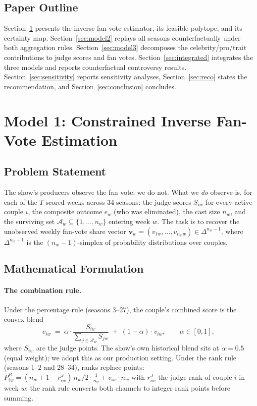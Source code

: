 \documentclass[11pt]{article}
\begin{document}
\subsection{Paper Outline}

Section~\ref{sec:model1} presents the inverse fan-vote estimator, its feasible polytope, and its
certainty map. Section~\ref{sec:model2} replays all seasons counterfactually under both
aggregation rules. Section~\ref{sec:model3} decomposes the celebrity/pro/trait contributions to
judge scores and fan votes. Section~\ref{sec:integrated} integrates the three models and reports
counterfactual controversy results. Section~\ref{sec:sensitivity} reports sensitivity analyses,
Section~\ref{sec:reco} states the recommendation, and Section~\ref{sec:conclusion} concludes.

\clearpage
\section{Model 1: Constrained Inverse Fan-Vote Estimation}
\label{sec:model1}

\subsection{Problem Statement}

The show's producers observe the fan vote; we do not. What we \emph{do} observe is, for each of
the $T$ scored weeks across 34 seasons: the judge scores $S_{iw}$ for every active couple $i$, the
composite outcome $e_w$ (who was eliminated), the cast size $n_w$, and the surviving set
$\mathcal{A}_w \subseteq \{1,\dots,n_w\}$ entering week $w$. The task is to recover the
unobserved weekly fan-vote share vector
$\mathbf{v}_w = (v_{1w}, \dots, v_{n_w w}) \in \Delta^{n_w - 1}$,
where $\Delta^{n_w - 1}$ is the $(n_w-1)$-simplex of probability distributions over couples.

\subsection{Mathematical Formulation}

\paragraph{The combination rule.} Under the percentage rule (seasons 3--27), the couple's
combined score is the convex blend
\begin{equation}
c_{iw} \;=\; \alpha \cdot \frac{S_{iw}}{\sum_{j \in \mathcal{A}_w} S_{jw}}
\;+\; (1-\alpha)\cdot v_{iw}, \qquad \alpha \in [0,1],
\label{eq:combo}
\end{equation}
where $S_{iw}$ are the judge points. The show's own historical blend sits at $\alpha = 0.5$
(equal weight); we adopt this as our production setting. Under the rank rule (seasons 1--2 and
28--34), ranks replace points: $P^{R}_{iw} = (n_w + 1 - r^{J}_{iw})\,n_w/2 \cdot \tfrac{1}{n_w} +
v_{iw}\cdot n_w$ with $r^{J}_{iw}$ the judge rank of couple $i$ in week $w$; the rank rule converts
both channels to integer rank points before summing.
\end{document}
